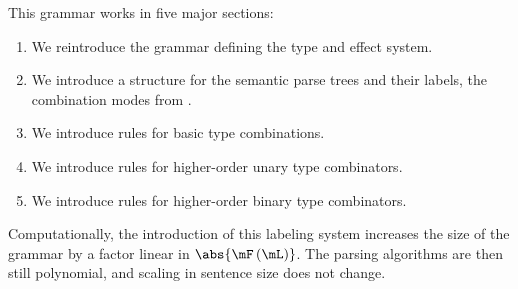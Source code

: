 \documentclass[math, english, info]{beamercours}
\begin{document}
\begin{frame}[allowframebreaks]
	This grammar works in five major sections:
	\begin{enumerate}
		\item We reintroduce the grammar defining the type and effect system.
		\item We introduce a structure for the semantic parse trees and their labels,
		      the combination modes from
		      \cite{bumfordEffectdrivenInterpretationFunctors2025}.
		\item We introduce rules for basic type combinations.
		\item We introduce rules for higher-order unary type combinators.
		\item We introduce rules for higher-order binary type combinators.
	\end{enumerate}
	Computationally, the introduction of this labeling system increases the size
	of the grammar by a factor linear in $\abs{\mF\left(\mL\right)}$.
	The parsing algorithms are then still polynomial, and scaling in sentence
	size does not change.
\end{frame}
\end{document}
